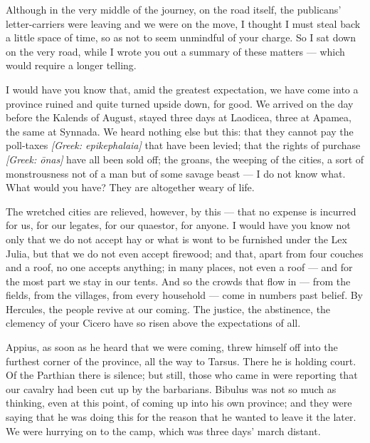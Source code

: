 

 Although in the very middle of the journey, on the road itself, the publicans' letter-carriers were leaving and we were on the move, I thought I must steal back a little space of time, so as not to seem unmindful of your charge. So I sat down on the very road, while I wrote you out a summary of these matters --- which would require a longer telling.

 I would have you know that, amid the greatest expectation, we have come into a province ruined and quite turned upside down, for good. We arrived on the day before the Kalends of August, stayed three days at Laodicea, three at Apamea, the same at Synnada. We heard nothing else but this: that they cannot pay the poll-taxes \textit{[Greek: epikephalaia]} that have been levied; that the rights of purchase \textit{[Greek: \=onas]} have all been sold off; the groans, the weeping of the cities, a sort of monstrousness not of a man but of some savage beast --- I do not know what. What would you have? They are altogether weary of life.

 The wretched cities are relieved, however, by this --- that no expense is incurred for us, for our legates, for our quaestor, for anyone. I would have you know not only that we do not accept hay or what is wont to be furnished under the Lex Julia, but that we do not even accept firewood; and that, apart from four couches and a roof, no one accepts anything; in many places, not even a roof --- and for the most part we stay in our tents. And so the crowds that flow in --- from the fields, from the villages, from every household --- come in numbers past belief. By Hercules, the people revive at our coming. The justice, the abstinence, the clemency of your Cicero have so risen above the expectations of all.

 Appius, as soon as he heard that we were coming, threw himself off into the furthest corner of the province, all the way to Tarsus. There he is holding court. Of the Parthian there is silence; but still, those who came in were reporting that our cavalry had been cut up by the barbarians. Bibulus was not so much as thinking, even at this point, of coming up into his own province; and they were saying that he was doing this for the reason that he wanted to leave it the later. We were hurrying on to the camp, which was three days' march distant.
